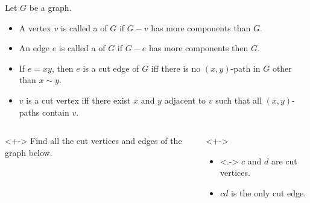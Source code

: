\documentclass
[ignorenonframetext,aspectratio=169]
{ngelessonslides}
\begin{document}
\begin{frame}[label=cut-def]
    \begin{definition}
        Let $G$ be a graph.
        \begin{itemize}
            \item A vertex $v$ is called a  of $G$ if $G-v$ has more components than $G$.
            \item An edge $e$ is called a  of $G$ if $G-e$ has more components then $G$.
        \end{itemize}
    \end{definition}
    \begin{itemize}
        \item If $e=xy$, then $e$ is a cut edge of $G$ iff
              there is no $(x,y)$-path in $G$ other than $x \sim y$.
        \item $v$ is a cut vertex iff there exist $x$ and $y$ adjacent to $v$
              such that all $(x,y)$-paths contain $v$.
    \end{itemize}
\end{frame}

\begin{frame}[label=cut-ex]
    \begin{columns}
    \begin{column}{0.45\textwidth}
        \begin{example}<+->
            Find all the cut vertices and edges of the graph
            below.
            \begin{center}
            \end{center}
        \end{example}
    \end{column}
    \begin{column}{0.45\textwidth}
        \begin{solution}<+->
            \begin{itemize}
                \item<.-> $c$ and $d$ are cut vertices.
                \item<+-> $cd$ is the only cut edge.
            \end{itemize}
        \end{solution}
    \end{column}
    \end{columns}
\end{frame}
\end{document}
